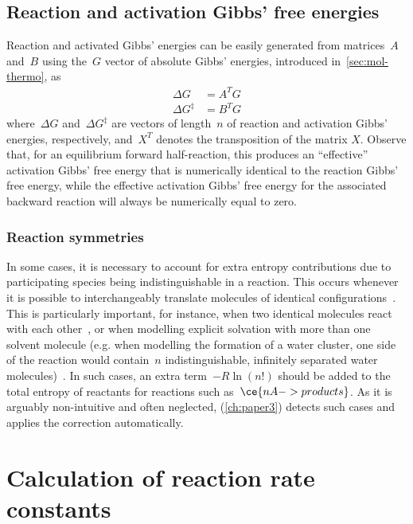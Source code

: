 \subsection{Reaction and activation Gibbs' free energies}%
\label{sec:reaction-energies}

Reaction and activated Gibbs' energies can be easily generated from matrices~$A$ and~$B$ using
the~$G$ vector of absolute Gibbs' energies,
introduced in~\cref{sec:mol-thermo},
as
% 
\begin{equation}
	\begin{split}
		\Delta G &= A^T G \\
		\Delta G^\ddagger &= B^T G
	\end{split}
\end{equation}
% 
where~$\Delta G$ and~$\Delta G^\ddagger$ are vectors of length~$n$ of reaction and activation Gibbs' energies,
respectively,
and~$X^T$ denotes the transposition of the matrix $X$.
Observe that,
for an equilibrium forward half-reaction,
this produces an ``effective'' activation Gibbs' free energy that is numerically identical
to the reaction Gibbs' free energy,
while the effective activation Gibbs' free energy for the associated backward reaction will always be numerically equal to zero.

\subsubsection{Reaction symmetries}

In some cases,
it is necessary to account
for extra entropy contributions due to participating species being indistinguishable in a reaction.
This occurs whenever it is possible
to interchangeably translate molecules of identical configurations~\cite{Fern_ndez_Ramos_2007,Gilson_2010}.
This is particularly important,
for instance,
when two identical molecules react with each other~\cite{Fern_ndez_Ramos_2007,Gilson_2010},
or when modelling explicit solvation with more than one solvent molecule (e.g.
when modelling the formation of a water cluster,
one side of the reaction would contain~$n$ indistinguishable,
infinitely separated water molecules)~\cite{Jensen_2015}.
In such cases,
an extra term~$-R \ln{\left( n! \right)}$ should be added to the total entropy
of reactants for reactions such as~$\ce{n A -> products}$.
As it is arguably non-intuitive and often neglected,
\overreact{} (\cref{ch:paper3}) detects such cases and applies the correction automatically.

\section{Calculation of reaction rate constants}%
\label{sec:rates}

